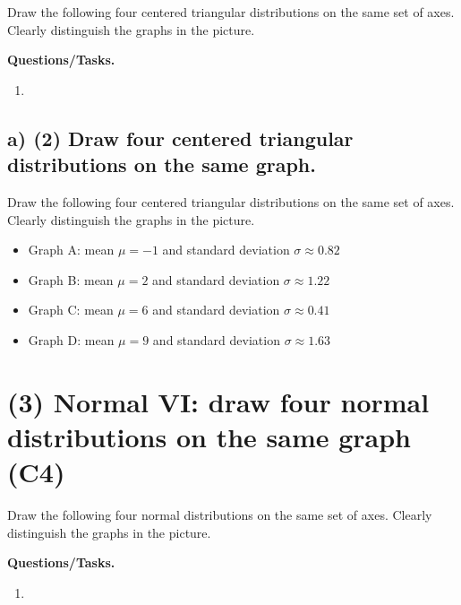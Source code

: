 	Draw the following four centered triangular distributions on the same set of axes. Clearly distinguish the graphs in the picture.
	
	\textbf{Questions/Tasks.}
	\begin{enumerate}[label=\textbf{\alph*)}]
		\item {}
	\end{enumerate}
	
	\subsection*{a) \textbf{(2)} Draw four centered triangular distributions on the same graph.}
	\label{subsec:triangular-draw-four-triangular-distributions-c4-a}
	Draw the following four centered triangular distributions on the same set of axes. Clearly distinguish the graphs in the picture.
	\begin{itemize}
		\item Graph A: mean $\mu=-1$ and standard deviation $\sigma\approx0.82$
		\item Graph B: mean $\mu=2$ and standard deviation $\sigma\approx1.22$
		\item Graph C: mean $\mu=6$ and standard deviation $\sigma\approx0.41$
		\item Graph D: mean $\mu=9$ and standard deviation $\sigma\approx1.63$
	\end{itemize}
	
	
	\section{(3) Normal VI: draw four normal distributions on the same graph (C4)}
	\label{sec:normal-vi-draw-four-normal-distributions-c4}
	
	Draw the following four normal distributions on the same set of axes. Clearly distinguish the graphs in the picture.
	
	\textbf{Questions/Tasks.}
	\begin{enumerate}[label=\textbf{\alph*)}]
		\item {}
	\end{enumerate}
	
